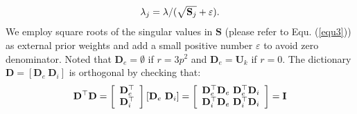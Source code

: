 \documentclass[10pt,twocolumn,letterpaper]{article}
\begin{document}
\begin{equation}\label{equ6}\vspace{-1mm}
\lambda_{j} = \lambda/(\sqrt{\mathbf{S}_{j}}+\varepsilon).
\end{equation}
We employ square roots of the singular values in $\mathbf{S}$ (please refer to Equ. (\ref{equ3})) as external prior weights and add a small positive number $\varepsilon$ to avoid zero denominator. Noted that $\mathbf{D}_{e}=\emptyset$ if $r=3p^{2}$ and $\mathbf{D}_{e}=\mathbf{U}_{k}$ if $r=0$. The dictionary $\mathbf{D} = [\mathbf{D}_{e}\ \mathbf{D}_{i}]$ is orthogonal by checking that:
\vspace{-2mm}
\begin{equation}\label{equ7}\vspace{-1mm}
\mathbf{D}^{\top}\mathbf{D} = 
\left[\begin{array}{c}
\mathbf{D}_{e}^{\top}
\\
\mathbf{D}_{i}^{\top}
\end{array}\right]
[\mathbf{D}_{e}\ \mathbf{D}_{i}]
=
\left[\begin{array}{cc}
\mathbf{D}_{e}^{\top}\mathbf{D}_{e}\ \mathbf{D}_{e}^{\top}\mathbf{D}_{i}
\\
\mathbf{D}_{i}^{\top}\mathbf{D}_{e}\ \mathbf{D}_{i}^{\top}\mathbf{D}_{i}
\end{array}\right]
=
\mathbf{I}
\end{equation}
\end{document}
